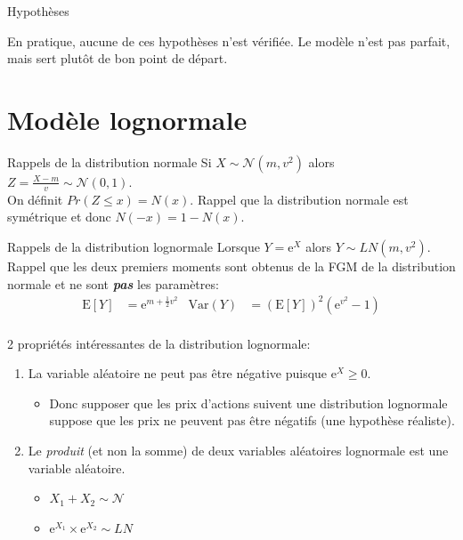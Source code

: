 \documentclass[10pt, french]{article}
\begin{document}
\begin{multicols*}{2}
\begin{conceptgen}{Hypothèses}
\tcbline

En pratique, aucune de ces hypothèses n'est vérifiée. Le modèle n'est pas parfait, mais sert plutôt de bon point de départ.
\end{conceptgen}

\newpage

\section{Modèle lognormale}

\begin{rappel}{Rappels de la distribution normale}
Si $X \sim \mathcal{N}(m, v^{2})$ alors $Z = \frac{X - m}{v} \sim \mathcal{N}(0, 1)$.\\

On définit $Pr(Z \le x) = N(x)$.
Rappel que la distribution normale est symétrique et donc $N(-x) = 1 - N(x)$.
\end{rappel}

\begin{rappel}{Rappels de la distribution lognormale}
Lorsque $Y = \textrm{e}^{X}$ alors $Y \sim LN(m,v^{2})$.\\

Rappel que les deux premiers moments sont obtenus de la FGM de la distribution normale et ne sont \textbf{\textit{pas}} les paramètres:
\begin{align*}
	\text{E}[Y]
	&=	\textrm{e}^{m + \frac{1}{2}v^{2}}	&
	\text{Var}(Y)
	&=	\left(\text{E}[Y]\right)^{2} \left(\textrm{e}^{v^{2}} - 1\right)	\\
\end{align*}

\tcbline

2 propriétés intéressantes de la distribution lognormale:
\begin{enumerate}[leftmargin = *]
	\item	La variable aléatoire ne peut pas être négative puisque $\textrm{e}^{X} \ge 0$.
		\begin{itemize}[leftmargin = *]
		\item	Donc supposer que les prix d'actions suivent une distribution lognormale suppose que les prix ne peuvent pas être négatifs (une hypothèse réaliste).
		\end{itemize}
	\item	Le \textit{produit} (et non la somme) de deux variables aléatoires lognormale est une variable aléatoire.
		\begin{itemize}[leftmargin = *]
		\item	$X_{1} + X_{2} \sim \mathcal{N}$
		\item	$\textrm{e}^{X_{1}} 	\times \textrm{e}^{X_{2}} \sim LN$
		\end{itemize}
\end{enumerate}
\end{rappel}


\end{multicols*}
\end{document}
